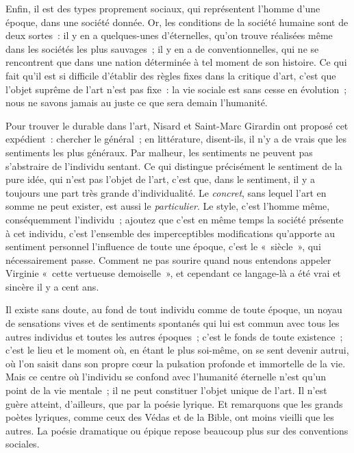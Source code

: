 \documentclass[french,twoside]{book} %
\begin{document}
Enfin, il est des types proprement sociaux, qui représentent l’homme d’une époque, dans une société donnée. Or, les conditions de la société humaine sont de deux sortes : il y en a quelques-unes d’éternelles, qu’on trouve réalisées même dans les sociétés les plus sauvages ; il y en a de conventionnelles, qui ne se rencontrent que dans une nation déterminée à tel moment de son histoire. Ce qui fait qu’il est si difficile d’établir des règles fixes dans la critique d’art, c’est que l’objet suprême de l’art n’est pas fixe : la vie sociale est sans cesse en évolution ; nous ne savons jamais au juste ce que sera demain l’humanité.\par
Pour trouver le durable dans l’art, Nisard et Saint-Marc Girardin ont proposé cet expédient : chercher le général ; en littérature, disent-ils, il n’y a de vrais que les sentiments les plus généraux. Par malheur, les sentiments ne peuvent pas s’abstraire de l’individu sentant. Ce qui distingue précisément le sentiment de la pure idée, qui n’est pas l’objet de l’art, c’est que, dans le sentiment, il y a toujours une part très grande d’individualité. Le \emph{concret}, sans lequel l’art en somme ne peut exister, est aussi le \emph{particulier}. Le style, c’est l’homme même, conséquemment l’individu ; ajoutez que c’est en même temps la société présente à cet individu, c’est l’ensemble des imperceptibles modifications qu’apporte au sentiment personnel l’influence de toute une époque, c’est le « siècle », qui nécessairement passe. Comment ne pas sourire quand nous entendons appeler Virginie « cette vertueuse demoiselle », et cependant ce langage-là a été vrai et sincère il y a cent ans.\par
Il existe sans doute, au fond de tout individu comme de toute époque, un noyau de sensations vives et de sentiments spontanés qui lui est commun avec tous les autres individus et toutes les autres époques ; c’est le fonds de toute existence ; c’est le lieu et le moment où, en étant le plus soi-même, on se sent devenir autrui, où l’on saisit dans son propre cœur la pulsation profonde et immortelle de la vie. Mais ce centre où l’individu se confond avec l’humanité éternelle n’est qu’un point de la vie mentale ; il ne peut constituer l’objet unique de l’art. Il n’est guère atteint, d’ailleurs, que par la poésie lyrique. Et remarquons que les grands poètes lyriques, comme ceux des Védas et de la Bible, ont moins vieilli que les autres. La poésie dramatique ou épique repose beaucoup plus sur des conventions sociales.\par
\end{document}
